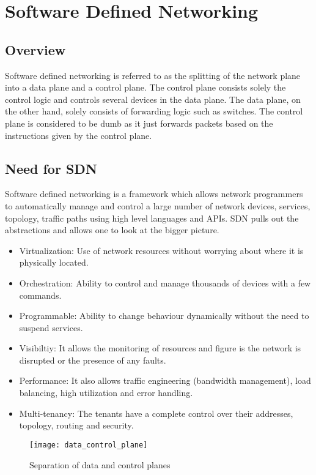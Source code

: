 \section{Software Defined Networking}
\subsection{Overview}
Software defined networking is referred to as the splitting of the network plane into a data plane and a control plane. The control plane consists solely the control logic and controls several devices in the data plane. The data plane, on the other hand, solely consists of forwarding logic such as switches. The control plane is considered to be dumb as it just forwards packets based on the instructions given by the control plane.

\subsection{Need for SDN}
Software defined networking is a framework which allows network programmers to automatically manage and control a large number of network devices, services, topology, traffic paths using high level languages and APIs. SDN pulls out the abstractions and allows one to look at the bigger picture. 
\begin{itemize}
    \item Virtualization: Use of network resources without worrying about where it is physically located.
    \item Orchestration: Ability to control and manage thousands of devices with a few commands.
    \item Programmable: Ability to change behaviour dynamically without the need to suspend services.
    \item Visibiltiy: It allows the monitoring of resources and figure is the network is disrupted or the presence of any faults.
    \item Performance: It also allows traffic engineering (bandwidth management), load balancing, high utilization and error handling.
    \item Multi-tenancy: The tenants have a complete control over their addresses, topology, routing and security.
\end{itemize}

\begin{figure}[h]
\begin{center}	
\texttt{[image: data\_control\_plane]} 
\caption{Separation of data and control planes }
\label{fig:data_control_plane}
\end{center}
\end{figure}

